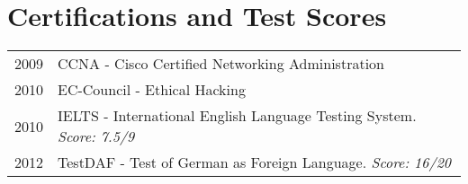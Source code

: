 \section{Certifications and Test Scores} 
\begin{longtable}
	{r|p{13cm}} 
	\textsc{2009} & CCNA - Cisco Certified Networking Administration\\
	\textsc{2010} & EC-Council - Ethical Hacking\\
	\textsc{2010} & IELTS - International English Language Testing System. \emph{Score: 7.5/9} \\
	\textsc{2012} & TestDAF - Test of German as Foreign Language. \emph{Score: 16/20} \\	
\end{longtable}
